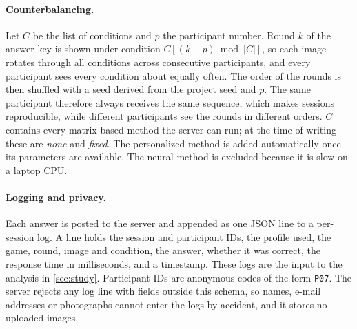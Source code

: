 \paragraph{Counterbalancing.}
Let $C$ be the list of conditions and $p$ the participant number. Round $k$ of the answer key is
shown under condition $C[(k + p) \bmod |C|]$, so each image rotates through all conditions
across consecutive participants, and every participant sees every condition about equally
often. The order of the rounds is then shuffled with a seed derived from the project seed and
$p$. The same participant therefore always receives the same sequence, which makes sessions
reproducible, while different participants see the rounds in different orders. $C$ contains
every matrix-based method the server can run; at the time of writing these are \emph{none}
and \emph{fixed}. The personalized method is added automatically once its
parameters are available. The neural method is excluded because it is slow on a laptop CPU.

\paragraph{Logging and privacy.}
Each answer is posted to the server and appended as one JSON line to a per-session log. A line
holds the session and participant IDs, the profile used, the game, round, image and condition,
the answer, whether it was correct, the response time in milliseconds, and a timestamp. These
logs are the input to the analysis in \cref{sec:study}. Participant IDs are anonymous codes of
the form \texttt{P07}. The server rejects any log line with fields outside this schema, so
names, e-mail addresses or photographs cannot enter the logs by accident, and it stores no
uploaded images.

